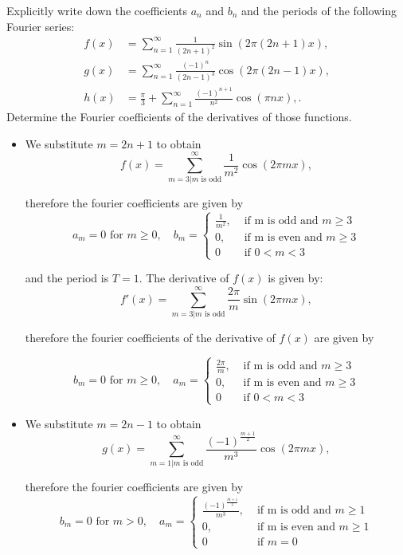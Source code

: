 \documentclass[11pt]{article}
\begin{document}
\begin{exercise}
    Explicitly write down the coefficients $a_n$ and $b_n$ and the periods of the following Fourier series:
    \begin{align*}
        f(x) &= \sum_{n=1}^{\infty} \frac{1}{(2n+1)^2}\sin(2\pi (2n+1) x),
        \\
        g(x) &= \sum_{n=1}^{\infty} \frac{(-1)^n}{(2n-1)^3}\cos(2\pi (2n-1) x),
        \\
        h(x) &= \frac \pi 3 + \sum_{n=1}^{\infty} \frac{(-1)^{n+1}}{n^2}\cos(\pi n x),
        .
    \end{align*}
    Determine the Fourier coefficients of the derivatives of those functions. 
\end{exercise}
\begin{solution}     
\begin{itemize}
\item We substitute $m = 2n+1$ to obtain 
$$
        f(x) = \sum_{m=3|m \text{ is odd}}^{\infty} \frac{1}{m^2}\cos(2\pi m x),
$$

therefore the fourier coefficients are given by 
$$
a_m = 0 \text{ for } m \geq 0, \quad b_m = \begin{cases}\frac{1}{m^2}, & \text { if m is odd and }m \geq 3 \\ 0, & \text{ if m is even and } m \geq 3\\ 0 & \text{ if } 0< m < 3  \end{cases} 
$$

and the period is $T = 1$. The derivative of $f(x)$ is given by:
$$
f'(x) = \sum_{m=3|m \text{ is odd}}^{\infty} \frac{2\pi}{m}\sin(2\pi m x),
$$

therefore the fourier coefficients of the derivative of $f(x)$ are given by 

$$
b_m = 0 \text{ for } m \geq 0, \quad a_m = \begin{cases}\frac{2\pi}{m}, & \text { if m is odd and }m \geq 3 \\ 0, & \text{ if m is even and } m \geq 3\\ 0 & \text{ if } 0< m < 3  \end{cases} 
$$

\item We substitute $m = 2n-1$ to obtain 
$$
       g(x) = \sum_{m=1|m \text{ is odd}}^{\infty} \frac{(-1)^{\frac{m+1}{2}}}{m^3}\cos(2\pi m x),
$$

therefore the fourier coefficients are given by 
$$
b_m = 0 \text{ for } m >0, \quad a_m = \begin{cases}\frac{(-1)^{\frac{m+1}{2}}}{m^3}, & \text { if m is odd and }m \geq 1 \\ 0, & \text{ if m is even and } m \geq 1\\ 0 & \text{ if } m = 0  \end{cases} 
$$


\end{itemize}
\end{solution}
\end{document}
